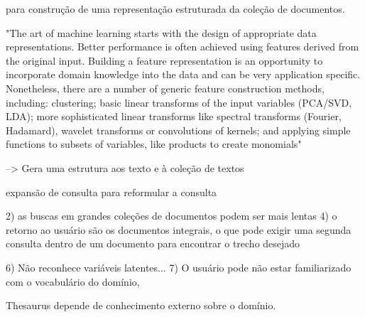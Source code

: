 para construção de uma representação estruturada da coleção de documentos.





"The art of machine learning starts with the design of appropriate data representations.  Better performance is often achieved using features derived from the original input. Building a feature representation is an opportunity to incorporate domain knowledge into the data and can be very application specific. Nonetheless, there are a number of generic feature construction methods, including: clustering; basic linear transforms of the input variables (PCA/SVD, LDA); more sophisticated linear transforms like spectral transforms (Fourier, Hadamard), wavelet transforms or convolutions of kernels; and applying simple functions to subsets of variables, like products to create monomials"







--> Gera uma estrutura aos texto e à coleção de textos



expansão de consulta para reformular a consulta

2) as buscas em grandes coleções de documentos podem ser mais lentas 
4) o retorno ao usuário são os documentos integrais, o que pode exigir uma segunda consulta dentro de um documento para encontrar o trecho desejado


6) Não reconhece variáveis latentes...
7) O usuário pode não estar familiarizado com o vocabulário do domínio, %

Thesaurus depende de conhecimento externo sobre o domínio.






